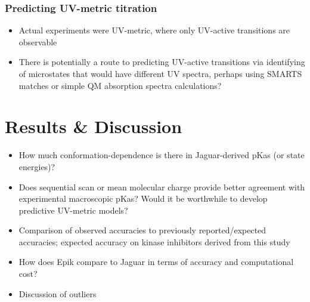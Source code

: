 \documentclass[9pt,lineno]{elife}
\begin{document}
\subsubsection{Predicting UV-metric titration}
\begin{itemize}
    \item Actual experiments were UV-metric, where only UV-active transitions are observable
    \item There is potentially a route to predicting UV-active transitions via identifying of microstates that would have different UV spectra, perhaps using SMARTS matches or simple QM absorption spectra calculations?
\end{itemize}

\section{Results \& Discussion}
\begin{itemize}
    \item How much conformation-dependence is there in Jaguar-derived pKas (or state energies)?
    \item Does sequential scan or mean molecular charge provide better agreement with experimental macroscopic pKas? Would it be worthwhile to develop predictive UV-metric models?
    \item Comparison of observed accuracies to previously reported/expected accuracies; expected accuracy on kinase inhibitors derived from this study
    \item How does Epik compare to Jaguar in terms of accuracy and computational cost?
    \item Discussion of outliers
\end{itemize}
\end{document}
